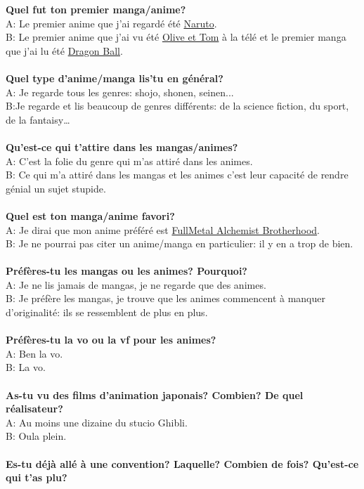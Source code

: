 \textbf{Quel fut ton premier manga/anime?}\\
A: Le premier anime que j'ai regardé été \underline{Naruto}.\\
B: Le premier anime que j'ai vu été \underline{Olive et Tom} à la télé et le
premier manga que j'ai lu été \underline{Dragon Ball}.\\
\\
\textbf{Quel type d'anime/manga lis'tu en général?}\\
A: Je regarde tous les genres: shojo, shonen, seinen...\\
B:Je regarde et lis beaucoup de genres différents: de la science fiction, du
sport, de la fantaisy\ldots\\
\\
\textbf{Qu'est-ce qui t'attire dans les mangas/animes?}\\
A: C'est la folie du genre qui m'as attiré dans les animes.\\
B: Ce qui m'a attiré dans les mangas et les animes c'est leur capacité de
rendre génial un sujet stupide.\\
\\
\textbf{Quel est ton manga/anime favori?}\\
A: Je dirai que mon anime préféré est \underline{FullMetal Alchemist
Brotherhood}.\\
B: Je ne pourrai pas citer un anime/manga en particulier: il y en a trop de
bien.\\
\\
\textbf{Préfères-tu les mangas ou les animes? Pourquoi?}\\
A: Je ne lis jamais de mangas, je ne regarde que des animes.\\
B: Je préfère les mangas, je trouve que les animes commencent à manquer
d'originalité: ils se ressemblent de plus en plus.\\
\\
\textbf{Préfères-tu la vo ou la vf pour les animes?}\\
A: Ben la vo.\\
B: La vo.\\
\\
\textbf{As-tu vu des films d'animation japonais? Combien? De quel réalisateur?}\\
A: Au moins une dizaine du stucio Ghibli.\\
B: Oula plein.\\
\\
\textbf{Es-tu déjà allé à une convention? Laquelle? Combien de fois? Qu'est-ce qui t'as plu?}\\
